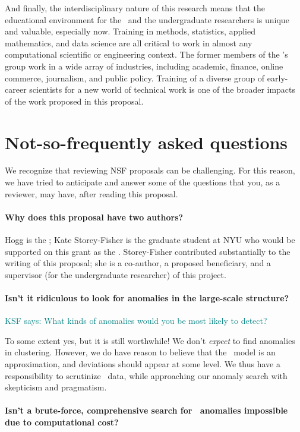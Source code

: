 \documentclass[12pt, fullpage, letterpaper]{article}
\newcommand{\KSF}[1]{\textcolor{teal}{KSF says: #1}}
\begin{document}
And finally, the interdisciplinary nature of this research means that the educational environment for the \GRA\ and the undergraduate researchers is unique and valuable, especially now.
Training in methods, statistics, applied mathematics, and data science are all critical to work in almost any computational scientific or engineering context.
The former members of the \PI's group work in a wide array of industries, including academic, finance, online commerce, journalism, and public policy.
Training of a diverse group of early-career scientists for a new world of technical work is one of the broader impacts of the work proposed in this proposal.

\section{Not-so-frequently asked questions}

We recognize that reviewing NSF proposals can be challenging.
For this reason, we have tried to anticipate and answer some of the
questions that you, as a reviewer, may have, after reading this
proposal.

\paragraph{Why does this proposal have two authors?}
Hogg is the \PI; Kate Storey-Fisher is the graduate student at NYU who would be supported on this grant as the \GRA.
Storey-Fisher contributed substantially to the writing of this proposal; she is a co-author, a proposed beneficiary, and a supervisor (for the undergraduate researcher) of this project.

\paragraph{Isn't it ridiculous to look for anomalies in the large-scale structure?} \KSF{What kinds of anomalies would you be most likely to detect?}

To some extent yes, but it is still worthwhile! We don't \emph{expect} to find anomalies in clustering. However, we do have reason to believe that the \LCDM\ model is an approximation, and deviations should appear at some level. We thus have a responsibility to scrutinize \LSS\ data, while approaching our anomaly search with skepticism and pragmatism. 

\paragraph{Isn't a brute-force, comprehensive search for \LSS\ anomalies impossible due to computational cost?}
\end{document}
